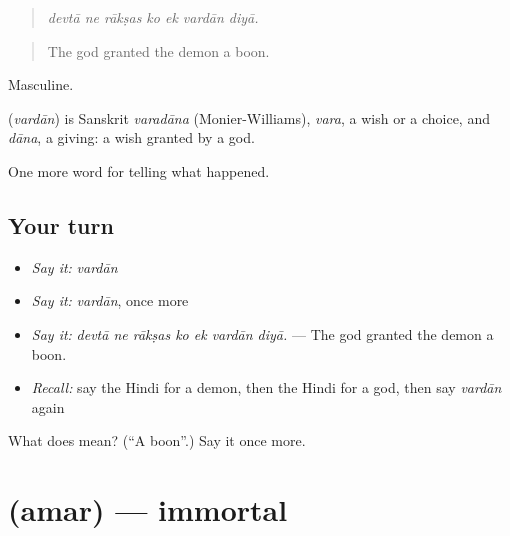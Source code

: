 \begin{quote}
      
\end{quote}

\begin{quote}
\emph{devtā ne rākṣas ko ek vardān diyā.}
\end{quote}

\begin{quote}
The god granted the demon a boon.
\end{quote}

Masculine.

\begin{cousinweb}
\textbf{} (\emph{vardān}) is Sanskrit \emph{varadāna} (Monier-Williams), \emph{vara}, a wish or a choice, and \emph{dāna}, a giving: a wish granted by a god.
\end{cousinweb}

\begin{grammarlens}[title={What you've built}]
One more word for telling what happened.
\end{grammarlens}

\subsection*{Your turn}
\begin{itemize}
\raggedright
  \item \emph{Say it:} \emph{vardān}
  \item \emph{Say it:} \emph{vardān}, once more
  \item \emph{Say it:} \emph{devtā ne rākṣas ko ek vardān diyā.} — The god granted the demon a boon.
  \item \emph{Recall:} say the Hindi for a demon, then the Hindi for a god, then say \emph{vardān} again
\end{itemize}

\begin{tcolorbox}[breakable,colback=teal!4,colframe=teal!35!black,title={Before you move on}]
What does  mean? (\textquotedblleft{}A boon\textquotedblright{}.) Say it once more.
\end{tcolorbox}
\section[\texorpdfstring{\hi{अमर} (amar)}{अमर (amar)}]{ (amar) — immortal}

\label{lesson:HI-C335-amar}



